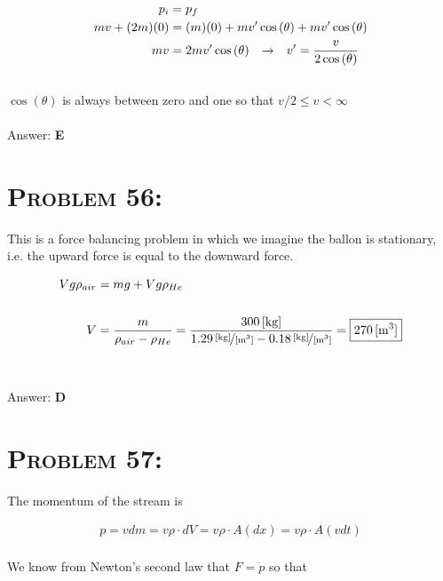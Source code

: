 \documentclass{article}
\begin{document}
\begin{align}
p_{i} &= p_{f}\nonumber\\
mv + (2m) (0) &= (m) (0) + m v' \cos{(\theta)} + m v' \cos{(\theta)} \nonumber\\
mv &=  2m v' \cos{(\theta)} \hspace{.1in} \rightarrow \hspace{.1in} v' = \frac{v}{2\cos{(\theta)}}\nonumber
\end{align}
\\
$\cos{(\theta)}$ is always between zero and one so that $v/2 \leq v < \infty$
\\\\
Answer: \textbf{\textcolor{ProcessBlue}E}\\


\section{\textsc{Problem 56:}} This is a force balancing problem in which we imagine the ballon is stationary, i.e. the upward force is equal to the downward force.

\begin{align}
  V g \rho_{air} &= mg + V g \rho_{He} \nonumber\\
  \nonumber\\
 V&= \frac{ m  }{ \rho_{air} - \rho_{He} }  =  \frac{ \unit[300]{[kg]}  }{ \unitfrac[1.29]{[kg]}{[m^{3}]} - \unitfrac[0.18]{[kg]}{[m^{3}]} } =  \boxed{\unit[270]{[m^{3}]} }\nonumber
\end{align}
\\\\
Answer: \textbf{\textcolor{ProcessBlue}D}\\


\section{\textsc{Problem 57:}} The momentum of the stream is

\begin{gather}
p = v dm= v \rho \cdot dV = v \rho \cdot A (dx) = v \rho \cdot A (v dt )\nonumber
\end{gather}
\\
We know from Newton's second law that $F =\dot{p}$ so that
\end{document}
